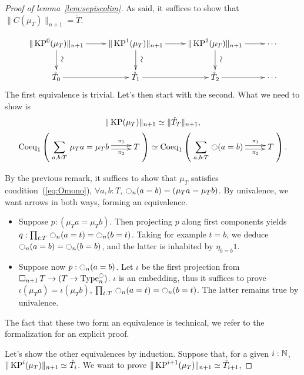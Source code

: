 \begin{proof}[Proof of lemma~\ref{lem:sepiscolim}]
  As said, it suffices to show that $\|C(\mu_T)\|_{n+1} =
  \mathring T$.

  \[
    \xymatrix{%
     \|\KP^0(\mu_T)\|_{n+1} \ar[r] \ar[d]^*[@]{\hbox to 0pt{\hss$\sim$\hss}}&
     \|\KP^1(\mu_T)\|_{n+1} \ar[r] \ar[d]^*[@]{\hbox to
       0pt{\hss$\sim$\hss}} & 
     \|\KP^2(\mu_T)\|_{n+1} \ar[r] \ar[d]^*[@]{\hbox to
       0pt{\hss$\sim$\hss}} & \cdots \\
     \mathring T_0 \ar[r] & \mathring T_1 \ar[r] &  \mathring T_2
     \ar[r] &\cdots
    }
  \]
  The first equivalence is trivial. Let's then start with the
  second. What we need to show is
  \[ \|\operatorname{KP}(\mu_T)\|_{n+1} \simeq \|\mathring T_T\|_{n+1}, \]
  \ie{}
  \[
    \mathrm{Coeq}_1 \left( 
      \xymatrix{
        \displaystyle{\sumD {a,b} T {\mu_T a = \mu_T b}} \ar@<-.5ex>[r]_-{\pi_2} \ar@<.5ex>[r]^-{\pi_1} & T
      }
    \right)
    \simeq \mathrm{Coeq}_1 \left( 
      \xymatrix{\displaystyle{\sumD {a,b} T{\modal (a=b)}} \ar@<-.5ex>[r]_-{\pi_2} \ar@<.5ex>[r]^-{\pi_1} & T}
    \right).
  \]
  
  By the previous remark, it suffices to show that $\mu_T$ satisfies condition~(\ref{eq:Omono}),
  \ie{} $\forall a,b:T$, $\ocircle_n (a=b) = (\mu_T a =
  \mu_T b)$. By univalence, we want arrows in both ways, forming an
  equivalence.
  \begin{itemize}
  \item Suppose $p : (\mu_T a = \mu_T b)$. Then projecting $p$ along
    first components yields $q : \prod_{t:T}\, \ocircle_n(a=t) = \ocircle_n (b=t)
    $.
    Taking for example $t=b$, we deduce $\ocircle_n (a=b) = \ocircle_n(b=b)$,
    and the latter is inhabited by $\eta_{b=b} 1$.
  \item Suppose now $p : \ocircle_n(a=b)$. Let $\iota$ be the first
    projection from $\mathop{\square_{n+1}} T \to (T \to \operatorname{Type}_n^{\ocircle})$. $\iota$ is
    an embedding, thus it suffices to prove $\iota (\mu_T a) = \iota
    (\mu_T b)$, \ie{} $\prod_{t:T}\, \ocircle_n (a=t) = \ocircle_n (b=t)$. The latter
    remains true by univalence.
  \end{itemize}
  The fact that these two form an equivalence is technical, we refer to
  the formalization for an explicit proof.


  Let's show the other equivalences by induction. Suppose that, for a
  given $i:\mathbb{N}$, $\|\operatorname{KP}^i(\mu_T)\|_{n+1} \simeq \mathring T_i$. We want
  to prove $\|\operatorname{KP}^{i+1}(\mu_T)\|_{n+1} \simeq \mathring T_{i+1}$, \ie{}


\end{proof}
